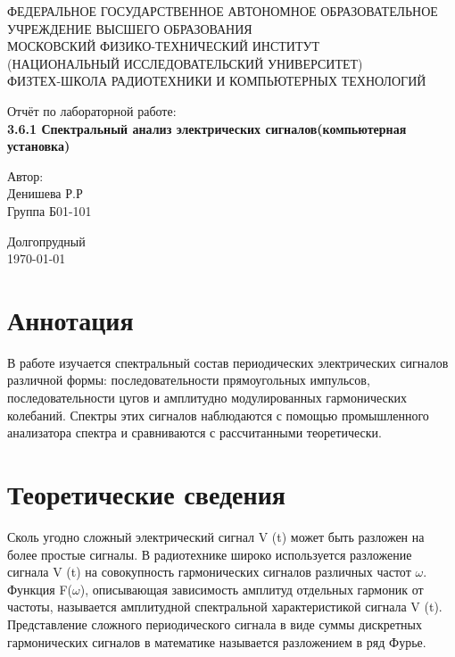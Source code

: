 \documentclass[a4paper,12pt]{article} %
\date{\today}
\begin{document}
\begin{titlepage}
    \begin{center}
         \footnotesize{ФЕДЕРАЛЬНОЕ ГОСУДАРСТВЕННОЕ АВТОНОМНОЕ ОБРАЗОВАТЕЛЬНОЕ \\УЧРЕЖДЕНИЕ ВЫСШЕГО ОБРАЗОВАНИЯ}\\
    \footnotesize{МОСКОВСКИЙ ФИЗИКО-ТЕХНИЧЕСКИЙ ИНСТИТУТ\\(НАЦИОНАЛЬНЫЙ 			ИССЛЕДОВАТЕЛЬСКИЙ УНИВЕРСИТЕТ)}\\
    \footnotesize{ФИЗТЕХ-ШКОЛА РАДИОТЕХНИКИ И КОМПЬЮТЕРНЫХ ТЕХНОЛОГИЙ\\}
    \end{center}
    \vspace*{5cm}
	{\huge
		\begin{center}
		
			{  Отчёт по лабораторной работе: }\\
			\bf3.6.1 Спектральный анализ электрических сигналов(компьютерная установка)
		\end{center}
	}
	\vspace{1cm}
	\begin{flushright}
		{\LARGE Автор:\\ Денишева Р.Р\\
			\vspace{0.2cm}
			Группа Б01-101}
	\end{flushright}
	\vspace{7cm}
	\begin{center}
		Долгопрудный\\
		\today
	\end{center}
\end{titlepage}


\section{Аннотация}

В работе изучается спектральный состав периодических электрических сигналов различной формы: последовательности прямоугольных импульсов, последовательности цугов и амплитудно модулированных гармонических колебаний. Спектры этих сигналов наблюдаются с помощью промышленного анализатора спектра и сравниваются с рассчитанными теоретически. 

\section{Теоретические сведения}

Сколь угодно сложный электрический сигнал V (t) может быть разложен на более простые сигналы. В радиотехнике широко используется разложение сигнала V (t) на совокупность гармонических сигналов различных частот $\omega$. Функция F($\omega$), описывающая зависимость амплитуд отдельных гармоник от частоты, называется амплитудной спектральной характеристикой сигнала V (t). Представление сложного периодического сигнала в виде суммы дискретных гармонических сигналов в математике называется разложением в ряд Фурье.
\end{document}
